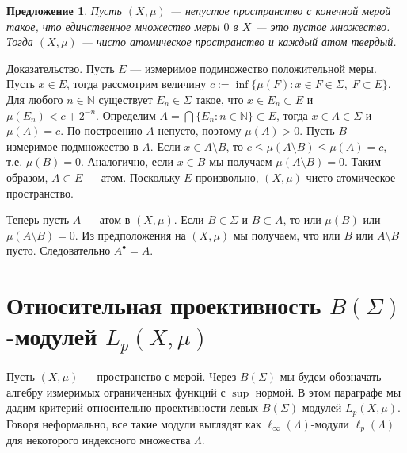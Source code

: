 \documentclass[12pt]{article}
\numberwithin{equation}{subsection}
\theoremstyle{plain}
\newtheorem{proposition}{Предложение}
\newenvironment{proof}{Доказательство.}{}
\begin{document}
\begin{fulltext}
    \begin{proposition}\label{GenniunelyAtomicMeasCharac} Пусть $(X,\mu)$ ---
        непустое пространство с конечной мерой такое, что единственное множество
        меры $0$ в $X$ --- это пустое множество. Тогда $(X,\mu)$ --- чисто
        атомическое пространство и каждый атом твердый.
    \end{proposition}
    \begin{proof} Пусть $E$ --- измеримое подмножество положительной меры. Пусть
        $x\in E$, тогда рассмотрим величину $c:=\inf \{\mu(F):x\in F\in
            \Sigma,\; F\subset E\}$. Для любого $n\in\mathbb{N}$ существует
        $E_n\in\Sigma$ такое, что $x\in E_n\subset E$ и $\mu(E_n)<c+2^{-n}$.
        Определим $A=\bigcap \{E_n:n\in\mathbb{N}\}\subset E$, тогда
        $x\in A\in\Sigma$ и $\mu(A)=c$. По построению $A$ непусто,
        поэтому $\mu(A)>0$. Пусть $B$ --- измеримое подмножество в $A$. Если
        $x\in A\setminus B$, то $c\leq\mu(A\setminus B)\leq\mu(A)=c$, т.е.
        $\mu(B)=0$. Аналогично, если $x\in B$ мы получаем $\mu(A\setminus B)=0$.
        Таким образом, $A\subset E$ --- атом. Поскольку $E$ произвольно,
        $(X,\mu)$ чисто атомическое пространство.

        Теперь пусть $A$ --- атом в $(X,\mu)$. Если $B\in\Sigma$ и $B\subset A$,
        то или $\mu(B)$ или $\mu(A\setminus B)=0$. Из предположения на $(X,\mu)$
        мы получаем, что или $B$ или $A\setminus B$ пусто. Следовательно
        $A^\bullet=A$.
    \end{proof}


    \section{Относительная проективность $B(\Sigma)$-модулей
      $L_p(X,\mu)$}\label{SectionRelativeProjectivityOfBSigmaModulesLpXmu}

    Пусть $(X,\mu)$ --- пространство с мерой. Через $B(\Sigma)$ мы будем
    обозначать алгебру измеримых ограниченных функций с $\sup$ нормой. В этом
    параграфе мы дадим критерий относительно проективности левых
    $B(\Sigma)$-модулей $L_p(X,\mu)$. Говоря неформально, все такие модули
    выглядят как $\ell_\infty(\Lambda)$-модули $\ell_p(\Lambda)$ для некоторого
    индексного множества $\Lambda$.


\end{fulltext}
\end{document}
